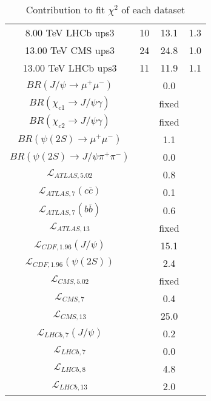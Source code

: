 \begin{table}[h!]
\begin{tabular}{c|c|c|c}
8.00 TeV LHCb ups3 & 10 & 13.1 & 1.3 \\
13.00 TeV CMS ups3 & 24 & 24.8 & 1.0 \\
13.00 TeV LHCb ups3 & 11 & 11.9 & 1.1 \\
\hline
$BR(J/\psi\rightarrow\mu^+\mu^-)$ &  & 0.0 &  \\
$BR(\chi_{c1}\rightarrow J/\psi\gamma)$ &  & fixed & \\
$BR(\chi_{c2}\rightarrow J/\psi\gamma)$ &  & fixed & \\
$BR(\psi(2S)\rightarrow\mu^+\mu^-)$ &  & 1.1 &  \\
$BR(\psi(2S)\rightarrow J/\psi\pi^+\pi^-)$ &  & 0.0 &  \\
$\mathcal L_{ATLAS,5.02}$ &  & 0.8 &  \\
$\mathcal L_{ATLAS,7}(c\overline c)$ &  & 0.1 &  \\
$\mathcal L_{ATLAS,7}(b\overline b)$ &  & 0.6 &  \\
$\mathcal L_{ATLAS,13}$ &  & fixed & \\
$\mathcal L_{CDF,1.96}(J/\psi)$ &  & 15.1 &  \\
$\mathcal L_{CDF,1.96}(\psi(2S))$ &  & 2.4 &  \\
$\mathcal L_{CMS,5.02}$ &  & fixed & \\
$\mathcal L_{CMS,7}$ &  & 0.4 &  \\
$\mathcal L_{CMS,13}$ &  & 25.0 &  \\
$\mathcal L_{LHCb,7}(J/\psi)$ &  & 0.2 &  \\
$\mathcal L_{LHCb,7}$ &  & 0.0 &  \\
$\mathcal L_{LHCb,8}$ &  & 4.8 &  \\
$\mathcal L_{LHCb,13}$ &  & 2.0 &  \\
\end{tabular}
\caption{Contribution to fit $\chi^2$ of each dataset}
\end{table}
